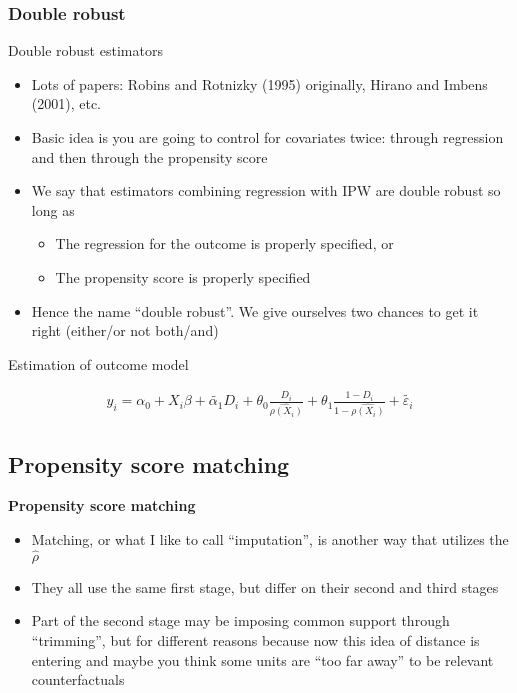 \documentclass{beamer}
\begin{document}
\subsubsection{Double robust}
\begin{frame}{Double robust estimators}

\begin{itemize}
\item Lots of papers: Robins and Rotnizky (1995) originally, Hirano and Imbens (2001), etc.
\item Basic idea is you are going to control for covariates twice: through regression and then through the propensity score
\item We say that estimators combining regression with IPW are double robust so long as
	\begin{itemize}
	\item The regression for the outcome is properly specified, or
	\item The propensity score is properly specified
	\end{itemize}
\item Hence the name ``double robust''. We give ourselves two chances to get it right (either/or not both/and)
\end{itemize}

\end{frame}

\begin{frame}{Estimation of outcome model}

\begin{eqnarray*}
y_i = \alpha_0 + X_i\beta + \tilde{\alpha_1} D_i + \theta_0 \frac{D_i}{\widehat{\rho (X_i)}} + \theta_1 \frac{1-D_i}{1- \widehat{\rho (X_i)}} + \tilde{\varepsilon_i}
\end{eqnarray*}

\end{frame}

\subsection{Propensity score matching}

\begin{frame}

	\begin{center}
	\textbf{Propensity score matching}
	\end{center}
	
	\begin{itemize}
	\item Matching, or what I like to call ``imputation'', is another way that utilizes the $\widehat{\rho}$
	\item They all use the same first stage, but differ on their second and third stages
	\item Part of the second stage may be imposing common support through ``trimming'', but for different reasons because now this idea of distance is entering and maybe you think some units are ``too far away'' to be relevant counterfactuals
	\end{itemize}

\end{frame}
\end{document}
